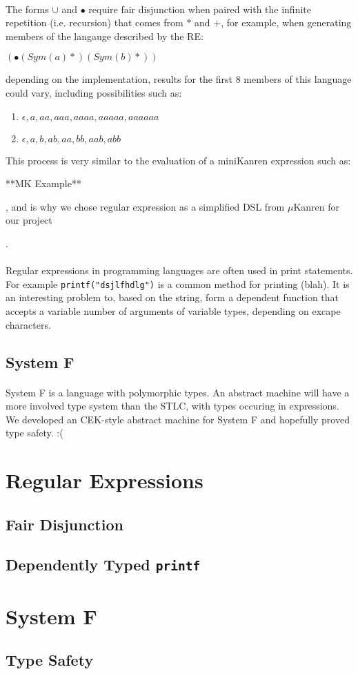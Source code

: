 \documentclass[12pt]{article}
\begin{document}
\paragraph{} The forms $\cup$ and $\bullet$ require fair disjunction when paired with the  infinite repetition (i.e. recursion) that comes from $*$ and $+$, for example, when generating members of the langauge described by the RE:

$(\bullet (Sym(a) *) (Sym(b) *))$

depending on the implementation, results for the first 8 members of this language could vary, including possibilities such as:

\begin{enumerate}
  \item ${\epsilon , a , aa , aaa , aaaa , aaaaa , aaaaaa}$
  \item ${\epsilon , a , b , ab , aa , bb , aab , abb}$
\end{enumerate}  
This process is very similar to the evaluation of a miniKanren expression such as:

**MK Example**

, and is why we chose regular expression as a simplified DSL from $\mu$Kanren for our project

.
\paragraph{} Regular expressions in programming languages are often used in print statements. For example \texttt{printf("dsjlfhdlg")} is a common method for printing (blah). It is an interesting problem to, based on the string, form a dependent function that accepts a variable number of arguments of variable types, depending on excape characters. 

\subsection{System F}
\paragraph{} System F is a language with polymorphic types. An abstract machine will have a more involved type system than the STLC, with types occuring in expressions. We developed an CEK-style abstract machine for System F and hopefully proved type safety. :(
\section{Regular Expressions}

\subsection{Fair Disjunction}

\subsection{Dependently Typed \texttt{printf}}

\section{System F}

\subsection{Type Safety}
\end{document}
